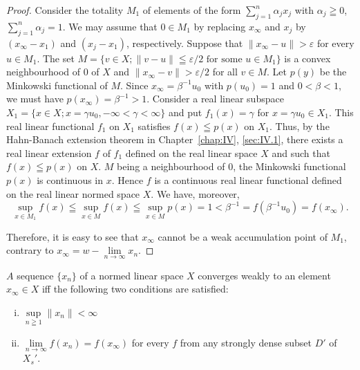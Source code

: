 \begin{proof}
 Consider the totality $M_1$ of elements of the form $\sum\limits_{j=1}^{n} \alpha_j x_j$ with $\alpha_j \geqq 0$, $\sum\limits_{j=1}^{n} \alpha_j = 1$. We may assume that $0 \in M_1$ by replacing $x_\infty$ and $x_j$ by $(x_\infty - x_1)$ and $(x_j - x_1)$, respectively. Suppose that $\|x_\infty - u\| > \varepsilon$ for every $u \in M_1$. The set $M = \{v \in X; \|v - u\| \leqq \varepsilon/2 \text{ for some } u \in M_1\}$ is a convex neighbourhood of $0$ of $X$ and $\|x_\infty - v\| > \varepsilon/2$ for all $v \in M$. Let $p(y)$ be the Minkowski functional of $M$. Since $x_\infty = \beta^{-1} u_0$ with $p(u_0) = 1$ and $0 < \beta < 1$, we must have $p(x_\infty) = \beta^{-1} > 1$. Consider a real linear subspace $X_1 = \{x \in X; x = \gamma u_0, -\infty < \gamma < \infty\}$ and put $f_1(x) = \gamma$ for $x = \gamma u_0 \in X_1$. This real linear functional $f_1$ on $X_1$ satisfies $f(x) \leqq p(x)$ on $X_1$. Thus, by the Hahn-Banach extension theorem in Chapter~\ref{chap:IV}, \ref{sec:IV.1}, there exists a real linear extension $f$ of $f_1$ defined on the real linear space $X$ and such that $f(x) \leqq p(x)$ on $X$. $M$ being a neighbourhood of $0$, the Minkowski functional $p(x)$ is continuous in $x$. Hence $f$ is a continuous real linear functional defined on the real linear normed space $X$. We have, moreover, 
\[
\sup\limits _ {x \in M _{1}} f (x) \leqq \sup\limits _{x \in M} f (x) \leqq \sup\limits _{x \in M} p (x) = 1 < \beta^{-1} = f (\beta^{-1} u _{0}) = f (x _{\infty}). \]

Therefore, it is easy to see that $x_{\infty}$ cannot be a weak accumulation point of $M_1$, contrary to $x_{\infty} = w - \lim\limits_{n \to \infty} x_n$. 
\end{proof}

\begin{theorem}\label{thm:V.1.Theorem.3} $A$ sequence $\{x_{n}\}$ of a normed linear space $X$ converges weakly to an element $x_{\infty} \in X$ iff the following two conditions are satisfied: \begin{enumerate}[i)]
\item $\sup\limits_{n \geqq 1} \|x_{n}\| < \infty$
\item $\lim\limits_{n \to \infty} f(x_{n}) = f(x_{\infty})$ for every $f$ from any strongly dense subset $D'$ of $X_{s}'$.
\end{enumerate}
\end{theorem}

